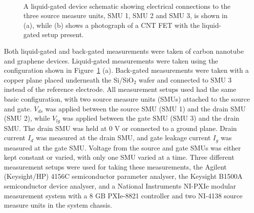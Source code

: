 \documentclass[
  a4paper,
]{scrbook}
\begin{document}
\begin{figure}
\begin{minipage}[t]{0.35\linewidth}
{{}

}

\end{minipage}%
%
\begin{minipage}[t]{0.01\linewidth}

{\centering 

~

}

\end{minipage}%

\caption{\label{fig-liquid-gate}A liquid-gated device schematic showing
electrical connections to the three source measure units, SMU 1, SMU 2
and SMU 3, is shown in (a), while (b) shows a photograph of a CNT FET
with the liquid-gated setup present.}

\end{figure}

Both liquid-gated and back-gated measurements were taken of carbon
nanotube and graphene devices. Liquid-gated measurements were taken
using the configuration shown in Figure~\ref{fig-liquid-gate} (a).
Back-gated measurements were taken with a copper plane placed underneath
the Si/SiO\(_2\) wafer and connected to SMU 3 instead of the reference
electrode. All measurement setups used had the same basic configuration,
with two source measure units (SMUs) attached to the source and gate.
\(V_{ds}\) was applied between the source SMU (SMU 1) and the drain SMU
(SMU 2), while \(V_{lg}\) was applied between the gate SMU (SMU 3) and
the drain SMU. The drain SMU was held at 0 V or connected to a ground
plane. Drain current \(I_{d}\) was measured at the drain SMU, and gate
leakage current \(I_{g}\) was measured at the gate SMU. Voltage from the
source and gate SMUs was either kept constant or varied, with only one
SMU varied at a time. Three different measurement setups were used for
taking these measurements, the Agilent (Keysight/HP) 4156C semiconductor
parameter analyser, the Keysight B1500A semiconductor device analyser,
and a National Instruments NI-PXIe modular measurement system with a 8
GB PXIe-8821 controller and two NI-4138 source measure units in the
system chassis.
\end{document}
